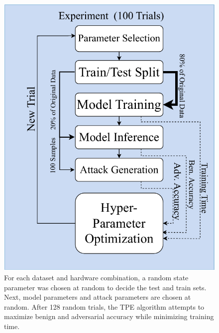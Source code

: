 \documentclass[conference]{IEEEtran}
\begin{document}


\begin{figure}
    \centering
    \includegraphics[width=.45\textwidth]{plots/experiment.pdf}
    \caption{For each dataset and hardware combination, a random state parameter was chosen at random to decide the test and train sets. Next, model parameters and attack parameters are chosen at random. After 128 random trials, the TPE algorithm attempts to maximize benign and adversarial accuracy while minimizing training time.}
    \label{fig:experiments}
\end{figure}
\end{document}
